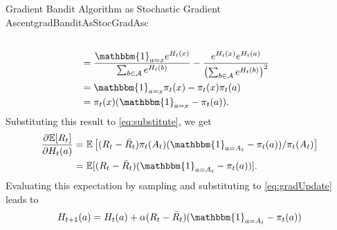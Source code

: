 \documentclass[../../main.tex]{subfiles}
\begin{document}
\begin{rem}{Gradient Bandit Algorithm as Stochastic Gradient Ascent}{gradBanditAsStocGradAsc}
\begin{align}
                    \\ &= \frac{\mathbbm{1}_{a=x}e^{H_t(x)}}{\sum_{b \in \mathcal{A}}e^{H_t(b)}} - \frac{e^{H_t(x)}e^{H_t(a)}}{\left( \sum_{b \in \mathcal{A}}e^{H_t(b)} \right)^2}
                    \\ &= \mathbbm{1}_{a=x}\pi_t(x)-\pi_t(x)\pi_t(a)
                    \\ &= \pi_t(x)(\mathbbm{1}_{a=x}-\pi_t(a)).
                \end{align}
                Substituting this result to \ref{eq:substitute}, we get
                \begin{align}
                    \frac{\partial\mathbb{E}[R_t]}{\partial H_t(a)}
                    &= \mathbb{E}\left[ (R_t-\bar{R}_t)\pi_t(A_t)(\mathbbm{1}_{a=A_t}-\pi_t(a))/\pi_t(A_t) \right]
                    \\ &= \mathbb{E}[(R_t-\bar{R}_t)(\mathbbm{1}_{a=A_t}-\pi_t(a))].
                \end{align}
                Evaluating this expectation by sampling and substituting to \ref{eq:gradUpdate} leads to
                \begin{equation}
                    H_{t+1}(a) = H_t(a) + \alpha(R_t-\bar{R}_t)(\mathbbm{1}_{a = A_t} - \pi_t(a))
                \end{equation}

            \end{rem}
\end{document}

